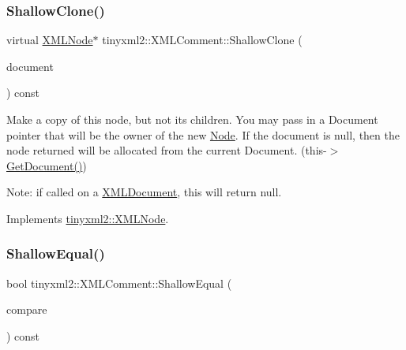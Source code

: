 \subsubsection{\texorpdfstring{Shallow\+Clone()}{ShallowClone()}\hspace{0.1cm}{\footnotesize\ttfamily [2/2]}}
{\footnotesize\ttfamily virtual \hyperlink{classtinyxml2_1_1XMLNode}{X\+M\+L\+Node}$\ast$ tinyxml2\+::\+X\+M\+L\+Comment\+::\+Shallow\+Clone (\begin{DoxyParamCaption}\item[{\hyperlink{classtinyxml2_1_1XMLDocument}{X\+M\+L\+Document} $\ast$}]{document }\end{DoxyParamCaption}) const\hspace{0.3cm}{\ttfamily [virtual]}}

Make a copy of this node, but not its children. You may pass in a Document pointer that will be the owner of the new \hyperlink{classNode}{Node}. If the \textquotesingle{}document\textquotesingle{} is null, then the node returned will be allocated from the current Document. (this-\/$>$\hyperlink{classtinyxml2_1_1XMLNode_af343d1ef0b45c0020e62d784d7e67a68}{Get\+Document()})

Note\+: if called on a \hyperlink{classtinyxml2_1_1XMLDocument}{X\+M\+L\+Document}, this will return null. 

Implements \hyperlink{classtinyxml2_1_1XMLNode_a8402cbd3129d20e9e6024bbcc0531283}{tinyxml2\+::\+X\+M\+L\+Node}.

\mbox{\label{classtinyxml2_1_1XMLComment_a965d880a99d58dd915caa88dc37a9b51}} 
\subsubsection{\texorpdfstring{Shallow\+Equal()}{ShallowEqual()}\hspace{0.1cm}{\footnotesize\ttfamily [1/2]}}
{\footnotesize\ttfamily bool tinyxml2\+::\+X\+M\+L\+Comment\+::\+Shallow\+Equal (\begin{DoxyParamCaption}\item[{const \hyperlink{classtinyxml2_1_1XMLNode}{X\+M\+L\+Node} $\ast$}]{compare }\end{DoxyParamCaption}) const\hspace{0.3cm}{\ttfamily [virtual]}}

